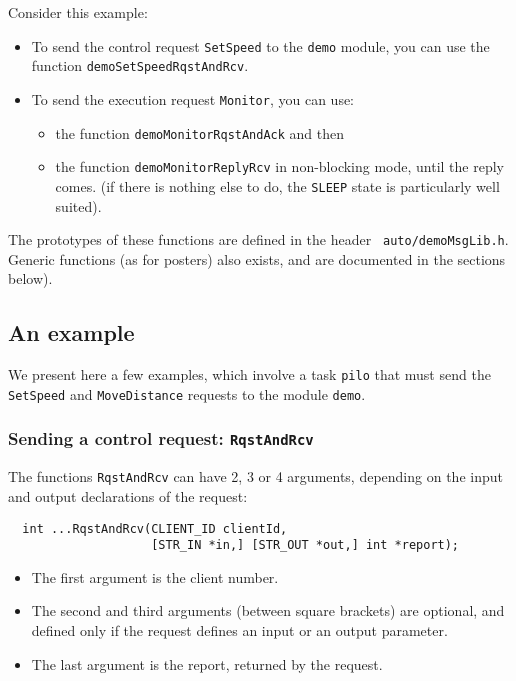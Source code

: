 Consider this example:

\begin{itemize}
\item To send the control request {\tt SetSpeed} to  the {\tt demo}
module, you can use the function {\tt demoSetSpeedRqstAndRcv}.

\item To send the execution request {\tt Monitor}, you can use:
   \begin{itemize}
      \item the function {\tt demoMonitorRqstAndAck} and then
      \item the function {\tt demoMonitorReplyRcv} in non-blocking mode,
until the reply comes. (if there is nothing else to do, the {\tt SLEEP}
state is particularly well suited).
   \end{itemize}
\end{itemize}

The prototypes  of  these  functions  are defined   in the  header   {\tt
auto/demoMsgLib.h}. Generic functions  (as for posters) also exists,
and are documented in the sections below).

\subsection{An example}

We  present here a few  examples, which involve  a task {\tt pilo} that
must send  the {\tt  SetSpeed} and   {\tt MoveDistance}  requests  to the
module {\tt demo}. 

\subsubsection{Sending a control request: {\tt RqstAndRcv}}

The functions {\tt RqstAndRcv} can have 2, 3 or 4 arguments, depending on
the input and output declarations of the request:

\begin{center}\begin{cartouche}\small\begin{verbatim}
  int ...RqstAndRcv(CLIENT_ID clientId,
                    [STR_IN *in,] [STR_OUT *out,] int *report);
\end{verbatim}\end{cartouche}\end{center}

\begin{itemize}
\item The first argument is the client number. 

\item The second and third arguments (between square brackets) are
optional, and defined only if the request defines an input or an output
parameter.

\item The last argument is the report, returned by the request.
\end{itemize}

